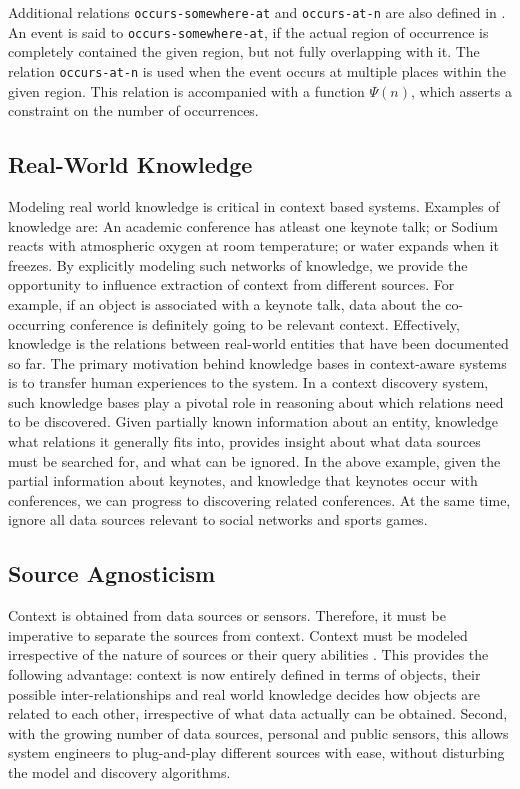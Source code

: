 Additional relations \texttt{occurs-somewhere-at} and \texttt{occurs-at-n} are also defined in \cite{gupta2011managing}. An event is said to \texttt{occurs-somewhere-at}, if the actual region of occurrence is completely contained the given region, but not fully overlapping with it. The relation \texttt{occurs-at-n} is used when the event occurs at multiple places within the given region. This relation is accompanied with a function $\Psi(n)$, which asserts a constraint on the number of occurrences. 

\subsection{Real-World Knowledge}
Modeling real world knowledge is critical in context based systems. Examples of knowledge are: An academic conference has atleast one keynote talk; or Sodium reacts with atmospheric oxygen at room temperature; or water expands when it freezes. By explicitly modeling such networks of knowledge, we provide the opportunity to influence extraction of context from different sources. For example, if an object is associated with a keynote talk, data about the co-occurring conference is definitely going to be relevant context. Effectively, knowledge is the relations between real-world entities that have been documented so far. The primary motivation behind knowledge bases in context-aware systems is to transfer human experiences to the system. In a context discovery system, such knowledge bases play a pivotal role in reasoning about which relations need to be discovered. Given partially known information about an entity, knowledge what relations it generally fits into, provides insight about what data sources must be searched for, and what can be ignored. In the above example, given the partial information about keynotes, and knowledge that keynotes occur with conferences, we can progress to discovering related conferences. At the same time, ignore all data sources relevant to social networks and sports games.


\subsection{Source Agnosticism}
Context is obtained from data sources or sensors. Therefore, it must be imperative to separate the sources from context. Context must be modeled irrespective of the nature of sources or their query abilities \cite{yerneni1999computing}. This provides the following advantage: context is now entirely defined in terms of objects, their possible inter-relationships and real world knowledge decides how objects are related to each other, irrespective of what data actually can be obtained. Second, with the growing number of data sources, personal and public sensors, this allows system engineers to plug-and-play different sources with ease, without disturbing the model and discovery algorithms.

